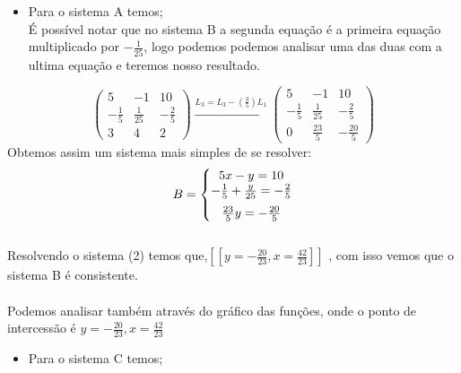 \documentclass{article}
\begin{document}
      \begin{itemize}
          \item Para o sistema A temos;
          \\          
          É possível notar que no sistema B a segunda equação é a primeira equação multiplicado por $ -\frac{1}{25}$, logo podemos podemos analisar uma das duas com a ultima equação e teremos nosso resultado. 
          
      \end{itemize}
      \begin{equation*}
      \begin{pmatrix} 5 &-1  &10 \\-\frac{1}{5}& \frac{1}{25} & -\frac{2}{5} \\ 3 & 4 & 2 \end{pmatrix}
      \xrightarrow[]{L_3=L_3-(\frac{3}{5})L_1}
      \begin{pmatrix} 5 &-1  &10 \\-\frac{1}{5}& \frac{1}{25} & -\frac{2}{5} \\ 0 & \frac{23}{5} & -\frac{20}{5} \end{pmatrix}
      \end{equation*}
      Obtemos assim um sistema mais simples de se resolver:
      \begin{equation}
        B = \left\{\begin{matrix} 5x - y = 10 \\ \medskip -\frac{1}{5} + \frac{y}{25} = -\frac{2}{5} \\  \frac{23}{5}y= -\frac{20}{5} \end{matrix}\right.
      \end{equation}
       \\ 
       Resolvendo o sistema (2) temos que,$\left [ \left [ y=-\frac{20}{23}  , x=\frac{42}{23}  \right ] \right ]$ , com isso vemos que o sistema B é consistente. \\
    \\ Podemos analisar também através do gráfico das funções, onde o ponto de intercessão é $ y=-\frac{20}{23}  , x=\frac{42}{23} $
    
    \begin{center}
    \end{center}

      \begin{itemize}
          \item Para o sistema C temos;
      \end{itemize}
      
\end{document}
